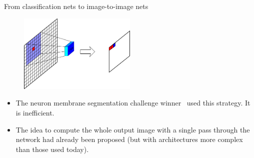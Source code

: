 \documentclass[xcolor=pdftex,dvipsnames,table,mathserif]{beamer}
\begin{document}
\begin{frame}{From classification nets to image-to-image nets}

      \begin{figure}
      \includegraphics[width=0.5\textwidth]{image_transf_fin.png}
      \end{figure}

\pause

      \begin{itemize}
      \item The neuron membrane segmentation challenge winner~\cite{ciresan_deep_2012} used this strategy. It is inefficient.
      \item The idea to compute the whole output image with a single pass through the network had already been proposed \cite{feng_ning_toward_2005, jain_supervised_2007} (but with architectures more complex than those used today).
      \end{itemize}

\end{frame}


\end{document}
